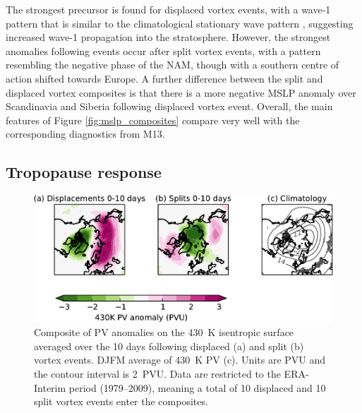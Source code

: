 The strongest precursor is found for displaced vortex events, with a wave-1
pattern that is similar to the climatological stationary wave pattern
\citep[e.g.,][]{Garfinkel2008}, suggesting increased wave-1 propagation into the
stratosphere. However, the strongest anomalies following events occur after
split vortex events, with a pattern resembling the negative phase of the NAM,
though with a southern centre of action shifted towards Europe. A further
difference between the split and displaced vortex composites is that there is a
more negative MSLP anomaly over Scandinavia and Siberia following displaced
vortex event. Overall, the main features of Figure \ref{fig:mslp_composites}
compare very well with the corresponding diagnostics from M13.



\subsection{Tropopause response}

\begin{figure}
 \centering
 \noindent\includegraphics[width=\textwidth]{figures/chapter-moments/PV_430K.pdf}
 \caption[Composites of 430~K PV]{Composite of PV anomalies on the 430~K
   isentropic surface averaged over the 10 days following displaced (a) and
   split (b) vortex events. DJFM average of 430~K PV (c). Units are PVU and the
   contour interval is 2~PVU. Data are restricted to the ERA-Interim period
   (1979--2009), meaning a total of 10 displaced and 10 split vortex events enter
   the composites. }
 \label{fig:430K_PV}
\end{figure}
 

